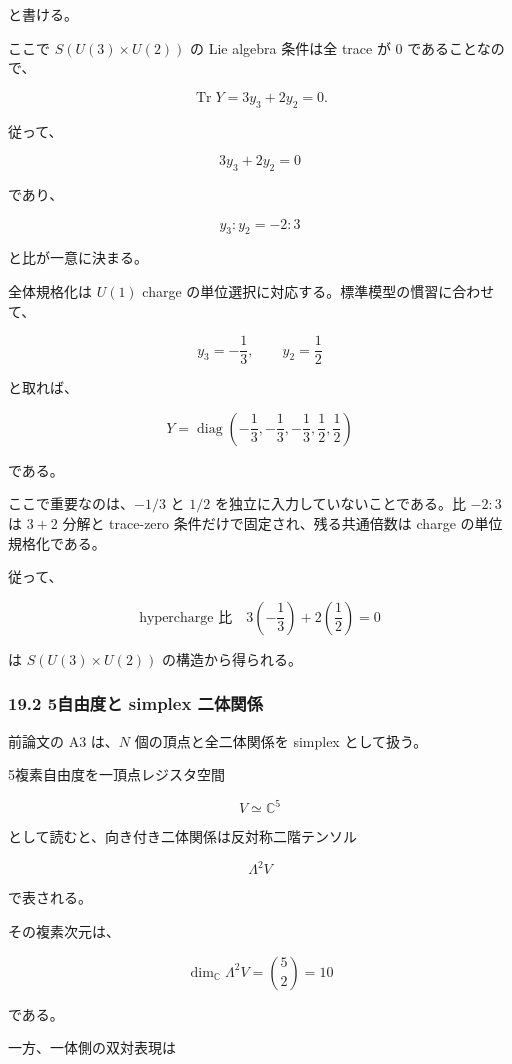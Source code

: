\documentclass[
  a4paper,
]{ltjsarticle}
\begin{document}
と書ける。

ここで \(S(U(3)\times U(2))\) の Lie algebra 条件は全 trace が 0
であることなので、

\[
\operatorname{Tr}Y
=
3y_3+2y_2
=
0.
\tag{100}
\]

従って、

\[
\boxed{
3y_3+2y_2=0
}
\tag{101}
\]

であり、

\[
\boxed{
y_3:y_2=-2:3
}
\tag{102}
\]

と比が一意に決まる。

全体規格化は \(U(1)\) charge
の単位選択に対応する。標準模型の慣習に合わせて、

\[
\boxed{
y_3=-\frac13,
\qquad
y_2=\frac12
}
\tag{103}
\]

と取れば、

\[
\boxed{
Y
=
\operatorname{diag}
\left(
-\frac13,-\frac13,-\frac13,
\frac12,\frac12
\right)
}
\tag{104}
\]

である。

ここで重要なのは、\(-1/3\) と \(1/2\)
を独立に入力していないことである。比 \(-2:3\) は \(3+2\) 分解と
trace-zero 条件だけで固定され、残る共通倍数は charge
の単位規格化である。

従って、

\[
\boxed{
\text{hypercharge 比}
\quad
3\left(-\frac13\right)
+
2\left(\frac12\right)
=0
}
\tag{105}
\]

は \(S(U(3)\times U(2))\) の構造から得られる。

\subsubsection{19.2 5自由度と simplex
二体関係}\label{ux81eaux7531ux5ea6ux3068-simplex-ux4e8cux4f53ux95a2ux4fc2}

前論文の A3 は、\(N\) 個の頂点と全二体関係を simplex として扱う。

5複素自由度を一頂点レジスタ空間

\[
V\simeq\mathbb C^5
\]

として読むと、向き付き二体関係は反対称二階テンソル

\[
\boxed{
\Lambda^2V
}
\tag{106}
\]

で表される。

その複素次元は、

\[
\boxed{
\dim_{\mathbb C}\Lambda^2V
=
\binom52
=
10
}
\tag{107}
\]

である。

一方、一体側の双対表現は
\end{document}
